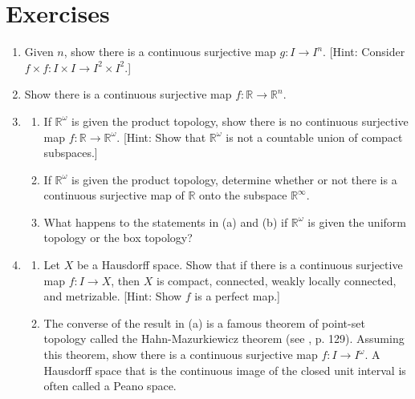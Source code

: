 \section*{Exercises}
\begin{enumerate}[itemsep=0.4em, parsep=0pt, topsep=0pt, partopsep=0pt, leftmargin=*, label=\arabic*., ref=\arabic*]
\item Given \(n\), show there is a continuous surjective map \(g : I \rightarrow {I}^{n}\). [Hint: Consider \(f \times f : I \times I \rightarrow {I}^{2} \times {I}^{2}.\)]
\item Show there is a continuous surjective map \(f : \mathbb{R} \rightarrow {\mathbb{R}}^{n}\).
\item
 \begin{enumerate}[itemsep=0.2em, parsep=0pt, topsep=0pt, partopsep=0pt, leftmargin=*, label=(\alph*), align=left]
 \item If \(\mathbb{R}^{\omega }\) is given the product topology, show there is no continuous surjective map \(f : \mathbb{R} \rightarrow {\mathbb{R}}^{\omega }\). [Hint: Show that \(\mathbb{R}^{\omega }\) is not a countable union of compact subspaces.]

 \item If \(\mathbb{R}^{\omega }\) is given the product topology, determine whether or not there is a continuous surjective map of \(\mathbb{R}\) onto the subspace \(\mathbb{R}^{\infty }\).
 \item What happens to the statements in (a) and (b) if \(\mathbb{R}^{\omega }\) is given the uniform topology or the box topology?
 \end{enumerate}
\item
 \begin{enumerate}[itemsep=0.2em, parsep=0pt, topsep=0pt, partopsep=0pt, leftmargin=*, label=(\alph*), align=left]
 \item Let \(X\) be a Hausdorff space. Show that if there is a continuous surjective map \(f : I \rightarrow X\), then \(X\) is compact, connected, weakly locally connected, and metrizable. [Hint: Show \(f\) is a perfect map.]

 \item The converse of the result in (a) is a famous theorem of point-set topology called the Hahn-Mazurkiewicz theorem (see \cite{HockingYoung1961}, p. 129). Assuming this theorem, show there is a continuous surjective map \(f : I \rightarrow {I}^{\omega }\). A Hausdorff space that is the continuous image of the closed unit interval is often called a Peano space.
 \end{enumerate}
\end{enumerate}

